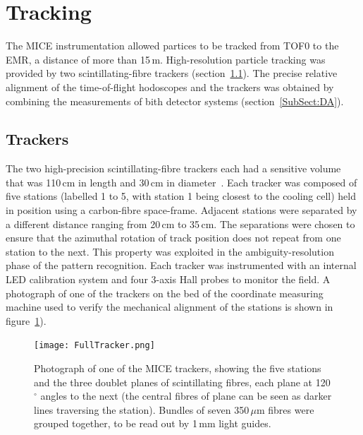 \section{Tracking}
\label{Sect:Tracking}

The MICE instrumentation allowed partices to be tracked from TOF0 to
the EMR, a distance of more than 15\,m.
High-resolution particle tracking was provided by two
scintillating-fibre trackers (section~\ref{SubSect:Tracker}).
The precise relative alignment of the time-of-flight hodoscopes and
the trackers was obtained by combining the measurements of bith
detector systems (section~\ref{SubSect:DA}). 

\graphicspath{{06-Tracking/Figures/}}

\subsection{Trackers}
\label{SubSect:Tracker}

The two high-precision scintillating-fibre trackers each had a
sensitive volume that was 110\,cm in length and 30\,cm in
diameter~\cite{Ellis:2010bb}.
Each tracker was composed of five stations (labelled 1 to 5, with
station 1 being closest to the cooling cell) held in position using a
carbon-fibre space-frame.  
Adjacent stations were separated by a different distance ranging from
20\,cm to 35\,cm.
The separations were chosen to ensure that the azimuthal rotation of
track position does not repeat from one station to the next.
This property was exploited in the ambiguity-resolution phase of the
pattern recognition.
Each tracker was instrumented with an internal LED calibration system
and four 3-axis Hall probes to monitor the field.
A photograph of one of the trackers on the bed of the coordinate
measuring machine used to verify the mechanical alignment of the
stations is shown in figure~\ref{Figure:FullTracker}).
\begin{figure}
  \begin{center}
    \texttt{[image: FullTracker.png]}
  \end{center}
  \caption{
    Photograph of one of the MICE trackers, showing the five stations
    and the three doublet planes of scintillating fibres, each plane
    at 120$^\circ$ angles to the next (the central fibres of plane can
    be seen as darker lines traversing the station).
    Bundles of seven 350\,$\mu$m fibres were grouped together, to be
    read out by 1\,mm light guides.
  }
  \label{Figure:FullTracker}
\end{figure}


